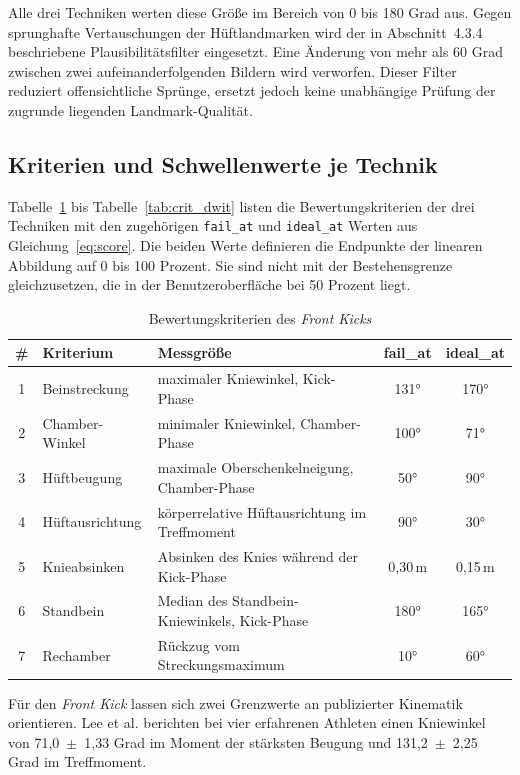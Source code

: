 \documentclass[intern]{cgMA}
\begin{document}
Alle drei Techniken werten diese Größe im Bereich von 0 bis 180 Grad aus. Gegen sprunghafte Vertauschungen der Hüftlandmarken wird der in Abschnitt~4.3.4 beschriebene Plausibilitätsfilter eingesetzt. Eine Änderung von mehr als 60 Grad zwischen zwei aufeinanderfolgenden Bildern wird verworfen. Dieser Filter reduziert offensichtliche Sprünge, ersetzt jedoch keine unabhängige Prüfung der zugrunde liegenden Landmark-Qualität.

\subsection{Kriterien und Schwellenwerte je Technik}
Tabelle~\ref{tab:crit_front} bis Tabelle~\ref{tab:crit_dwit} listen die Bewertungskriterien der drei Techniken mit den zugehörigen \texttt{fail\_at} und \texttt{ideal\_at} Werten aus Gleichung~\ref{eq:score}. Die beiden Werte definieren die Endpunkte der linearen Abbildung auf 0 bis 100 Prozent. Sie sind nicht mit der Bestehensgrenze gleichzusetzen, die in der Benutzeroberfläche bei 50 Prozent liegt.

\begin{table}[htbp]
\centering
\small
\begin{tabular}{c p{} p{} c c}
\hline
\# & \textbf{Kriterium} & \textbf{Messgröße} & \textbf{fail\_at} & \textbf{ideal\_at} \\ \hline
1 & Beinstreckung & maximaler Kniewinkel, Kick-Phase & 131° & 170° \\
2 & Chamber-Winkel & minimaler Kniewinkel, Chamber-Phase & 100° & 71° \\
3 & Hüftbeugung & maximale Oberschenkelneigung, Chamber-Phase & 50° & 90° \\
4 & Hüftausrichtung & körperrelative Hüftausrichtung im Treffmoment & 90° & 30° \\
5 & Knieabsinken & Absinken des Knies während der Kick-Phase & 0,30\,m & 0,15\,m \\
6 & Standbein & Median des Standbein-Kniewinkels, Kick-Phase & 180° & 165° \\
7 & Rechamber & Rückzug vom Streckungsmaximum & 10° & 60° \\ \hline
\end{tabular}
\caption{Bewertungskriterien des \textit{Front Kicks}}
\label{tab:crit_front}
\end{table}

Für den \textit{Front Kick} lassen sich zwei Grenzwerte an publizierter Kinematik orientieren. Lee et al. \cite{Lee2005} berichten bei vier erfahrenen Athleten einen Kniewinkel von 71,0~$\pm$~1,33 Grad im Moment der stärksten Beugung und 131,2~$\pm$~2,25 Grad im Treffmoment.
\end{document}
